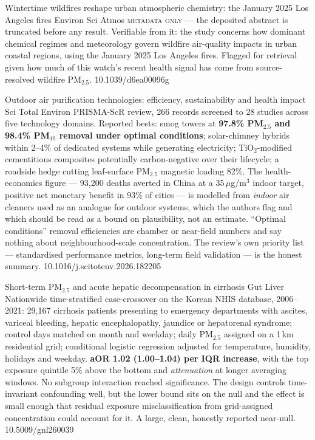 \documentclass[10pt]{article}
\begin{document}
{Wintertime wildfires reshape urban atmospheric chemistry: the January 2025 Los Angeles fires}
{Environ Sci Atmos}
{\textsc{metadata only} --- the deposited abstract is truncated before any result. Verifiable
from it: the study concerns how dominant chemical regimes and meteorology govern wildfire
air-quality impacts in urban coastal regions, using the January 2025 Los Angeles fires.
Flagged for retrieval given how much of this watch's recent health signal has come from
source-resolved wildfire PM$_{2.5}$.}
{10.1039/d6ea00096g}


{Outdoor air purification technologies: efficiency, sustainability and health impact}
{Sci Total Environ}
{PRISMA-ScR review, 266 records screened to 28 studies across five technology domains.
Reported bests: smog towers at \textbf{97.8\% PM$_{2.5}$ and 98.4\% PM$_{10}$ removal under
optimal conditions}; solar-chimney hybrids within 2--4\% of dedicated systems while
generating electricity; TiO$_2$-modified cementitious composites potentially carbon-negative
over their lifecycle; a roadside hedge cutting leaf-surface PM$_{2.5}$ magnetic loading 82\%.
The health-economics figure --- 93{,}200 deaths averted in China at a 35\,$\mu$g/m$^3$ indoor
target, positive net monetary benefit in 93\% of cities --- is modelled from \emph{indoor}
air cleaners used as an analogue for outdoor systems, which the authors flag and which should
be read as a bound on plausibility, not an estimate. ``Optimal conditions'' removal
efficiencies are chamber or near-field numbers and say nothing about neighbourhood-scale
concentration. The review's own priority list --- standardised performance metrics, long-term
field validation --- is the honest summary.}
{10.1016/j.scitotenv.2026.182205}


{Short-term PM$_{2.5}$ and acute hepatic decompensation in cirrhosis}
{Gut Liver}
{Nationwide time-stratified case-crossover on the Korean NHIS database, 2006--2021:
29{,}167 cirrhosis patients presenting to emergency departments with ascites, variceal
bleeding, hepatic encephalopathy, jaundice or hepatorenal syndrome; control days matched on
month and weekday; daily PM$_{2.5}$ assigned on a 1\,km residential grid; conditional logistic
regression adjusted for temperature, humidity, holidays and weekday.
\textbf{aOR 1.02 (1.00--1.04) per IQR increase}, with the top exposure quintile 5\% above the
bottom and \emph{attenuation} at longer averaging windows. No subgroup interaction reached
significance. The design controls time-invariant confounding well, but the lower bound sits
on the null and the effect is small enough that residual exposure misclassification from
grid-assigned concentration could account for it. A large, clean, honestly reported near-null.}
{10.5009/gnl260039}
\end{document}
